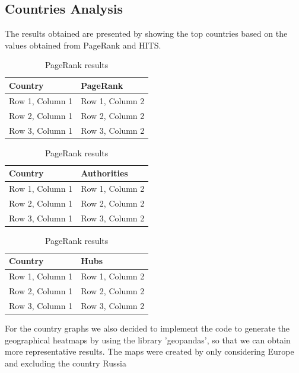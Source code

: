    \subsection*{Countries Analysis}
    The results obtained are presented by showing the top countries based on the values obtained from PageRank and HITS.
    \begin{table}[hbtp]
        \centering
    \begin{tabular}{l l}
        \hline
        \textbf{Country} & \textbf{PageRank} \\ \hline
        Row 1, Column 1 & Row 1, Column 2 \\
        Row 2, Column 1 & Row 2, Column 2 \\
        Row 3, Column 1 & Row 3, Column 2 \\ \hline
      \end{tabular}
      \caption{PageRank results}
      \label{tab:table-label}
    \end{table}
    \begin{table}[hbtp]
        \parbox{.45\linewidth}{
        \centering
        \begin{tabular}{l l}
            \hline
            \textbf{Country} & \textbf{Authorities} \\ \hline
            Row 1, Column 1 & Row 1, Column 2 \\
            Row 2, Column 1 & Row 2, Column 2 \\
            Row 3, Column 1 & Row 3, Column 2 \\ \hline
          \end{tabular}
          \caption{PageRank results}
          \label{tab:table-label}
        }
        \hfill
        \parbox{.45\linewidth}{
        \centering
        \begin{tabular}{l l}
            \hline
            \textbf{Country} & \textbf{Hubs} \\ \hline
            Row 1, Column 1 & Row 1, Column 2 \\
            Row 2, Column 1 & Row 2, Column 2 \\
            Row 3, Column 1 & Row 3, Column 2 \\ \hline
          \end{tabular}
          \caption{PageRank results}
          \label{tab:table-label}
        }
        \end{table}
    
    For the country graphs we also decided to implement the code to generate the geographical heatmaps by using the library
    'geopandas', so that we can obtain more representative results.
    The maps were created by only considering Europe and excluding the country Russia

